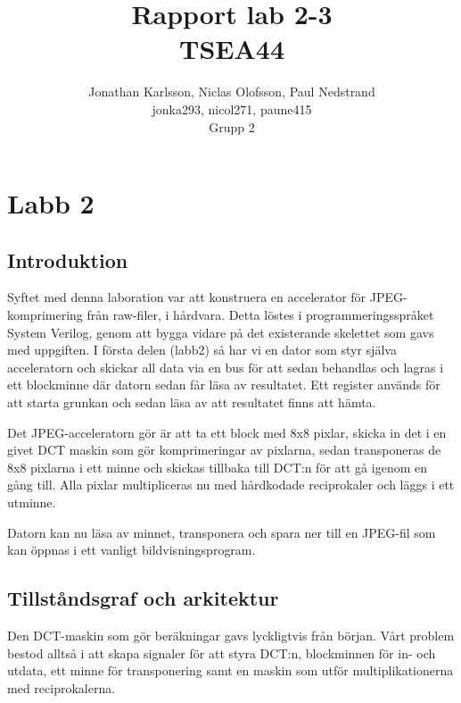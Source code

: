 \documentclass[a4paper]{article}
\author{Jonathan Karlsson, Niclas Olofsson, Paul Nedstrand\\jonka293, nicol271, paune415\\Grupp 2}
\title{Rapport lab 2-3\\ \vspace{2 mm} {\large TSEA44}}
\begin{document}
\maketitle

\newpage

\tableofcontents

\newpage
\section{Labb 2}
\subsection{Introduktion}

Syftet med denna laboration var att konstruera en accelerator för JPEG-
komprimering från raw-filer, i hårdvara. Detta löstes i
programmeringsspråket System Verilog, genom att bygga vidare på det
existerande skelettet som gavs med uppgiften. I första delen (labb2) så
har vi en dator som styr själva acceleratorn och skickar all data via en
bus för att sedan behandlas och lagras i ett blockminne där datorn sedan
får läsa av resultatet. Ett register används för att starta grunkan och
sedan läsa av att resultatet finns att hämta.

Det JPEG-acceleratorn gör är att ta ett block med 8x8 pixlar, skicka in
det i en givet DCT maskin som gör komprimeringar av pixlarna, sedan
transponeras de 8x8 pixlarna i ett minne och skickas tillbaka till
DCT:n för att gå igenom en gång till. Alla pixlar multipliceras nu
med hårdkodade reciprokaler och läggs i ett utminne.

Datorn kan nu läsa av minnet, transponera och spara ner till en JPEG-fil
som kan öppnas i ett vanligt bildvisningsprogram.

\subsection{Tillståndsgraf och arkitektur}

Den DCT-maskin som gör beräkningar gavs lyckligtvis från början. Vårt
problem bestod alltså i att skapa signaler för att styra DCT:n,
blockminnen för in- och utdata, ett minne för transponering samt en
maskin som utför multiplikationerna med reciprokalerna.
\end{document}
